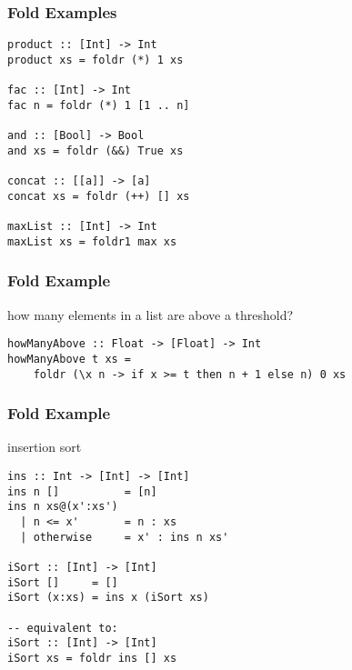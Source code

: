 \documentclass[dvipsnames]{beamer}
\theoremstyle{plain}
\begin{document}
\begin{frame}[fragile]
  \frametitle{Fold Examples}

  \begin{exampleblock}{}
    \begin{lstlisting}[deletekeywords={and, concat, product}]
product :: [Int] -> Int
product xs = foldr (*) 1 xs

fac :: [Int] -> Int
fac n = foldr (*) 1 [1 .. n]

and :: [Bool] -> Bool
and xs = foldr (&&) True xs

concat :: [[a]] -> [a]
concat xs = foldr (++) [] xs

maxList :: [Int] -> Int
maxList xs = foldr1 max xs
    \end{lstlisting}
  \end{exampleblock}
\end{frame}

\begin{frame}[fragile]
  \frametitle{Fold Example}

  \begin{exampleblock}{how many elements in a list are above a threshold?}
    \begin{lstlisting}
howManyAbove :: Float -> [Float] -> Int
howManyAbove t xs =
    foldr (\x n -> if x >= t then n + 1 else n) 0 xs
    \end{lstlisting}
  \end{exampleblock}
\end{frame}

\begin{frame}[fragile]
  \frametitle{Fold Example}

  \begin{exampleblock}{insertion sort}
    \begin{lstlisting}
ins :: Int -> [Int] -> [Int]
ins n []          = [n]
ins n xs@(x':xs')
  | n <= x'       = n : xs
  | otherwise     = x' : ins n xs'

iSort :: [Int] -> [Int]
iSort []     = []
iSort (x:xs) = ins x (iSort xs)

-- equivalent to:
iSort :: [Int] -> [Int]
iSort xs = foldr ins [] xs
    \end{lstlisting}
  \end{exampleblock}
\end{frame}
\end{document}
